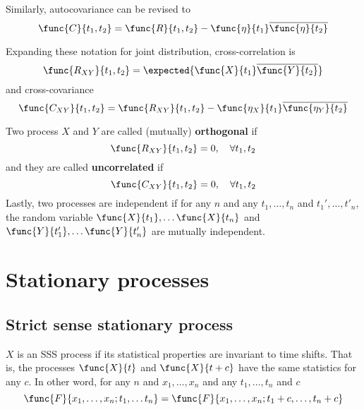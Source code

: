 Similarly, autocovariance can be revised to 
\begin{equation*}
    \func{C}{t_1,t_2} = \func{R}{t_1, t_2} - \func{\eta}{t_1}\overline{\func{\eta}{t_2}}
\end{equation*}

Expanding these notation for joint distribution, cross-correlation is 
\begin{equation*}
    \func{R_{XY}}{t_1,t_2} = \expected{\func{X}{t_1} \overline{\func{Y}{t_2}}}
\end{equation*}
and cross-covariance 
\begin{equation*}
    \func{C_{XY}}{t_1,t_2} = \func{R_{XY}}{t_1,t_2} - \func{\eta_X}{t_1}\overline{\func{\eta_Y}{t_2}}
\end{equation*}

\begin{definition}
    Two process \(X\) and \(Y\) are called (mutually) \textbf{orthogonal} if 
    \begin{equation*}
        \func{R_{XY}}{t_1,t_2} = 0 , \quad \forall t_1,t_2
    \end{equation*}
    and they are called \textbf{uncorrelated} if 
    \begin{equation*}
        \func{C_{XY}}{t_1,t_2} = 0 , \quad \forall t_1,t_2
    \end{equation*}
    Lastly, two processes are independent if for any \(n\) and any \(t_1, \dots , t_n\) and \(t_1' , \dots , t'_n\), the random variable \(\func{X}{t_1}, \dots \func{X}{t_n}\) and \(\func{Y}{t'_1}, \dots \func{Y}{t'_n}\) are mutually independent.
\end{definition}

\section{Stationary processes}
\subsection{Strict sense stationary process}
\(X\) is an SSS process if its statistical properties are invariant to time shifts. That is, the processes \(\func{X}{t}\) and \(\func{X}{t + c}\) have the same statistics for any \(c\). In other word, for any \(n\) and \(x_1, \dots , x_n\) and any \(t_1, \dots ,t_n\) and \(c\)
\begin{equation*}
    \func{F}{x_1, \dots, x_n; t_1, \dots t_n} = \func{F}{x_1, \dots, x_n ; t_1 + c, \dots , t_n + c}
\end{equation*}

